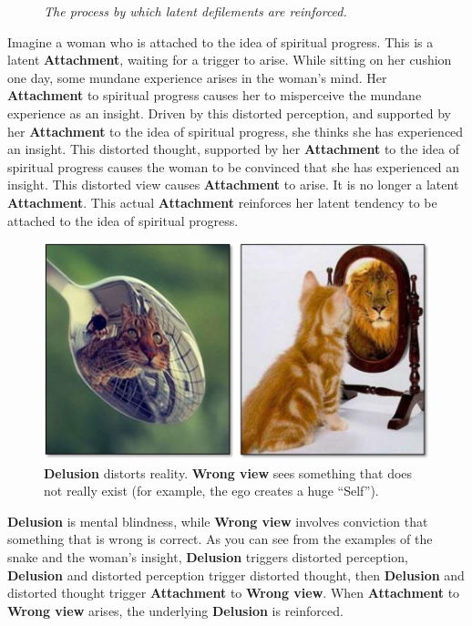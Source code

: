 \begin{figure}[H]
\centering

\caption{\textit{\small The process by which latent defilements are reinforced.}}
\label{fig:Latent}
\end{figure}

Imagine a woman who is attached to the idea of spiritual progress. This is a latent \textbf{Attachment}, waiting for a trigger to arise. While sitting on her cushion one day, some mundane experience arises in the woman’s mind. Her \textbf{Attachment} to spiritual progress causes her to misperceive the mundane experience as an insight. Driven by this distorted perception, and supported by her \textbf{Attachment} to the idea of spiritual progress, she thinks she has experienced an insight. This distorted thought, supported by her \textbf{Attachment} to the idea of spiritual progress causes the woman to be convinced that she has experienced an insight. This distorted view causes \textbf{Attachment} to arise. It is no longer a latent \textbf{Attachment}. This actual \textbf{Attachment} reinforces her latent tendency to be attached to the idea of spiritual progress.

\begin{figure}[H]

\centering
\includegraphics[width=0.7\linewidth]{./Diagrams/Cats}
\caption{\textbf{Delusion} distorts reality. \textbf{Wrong view} sees something that does not really exist (for example, the ego creates a huge “Self”).}
\label{fig:Cats}
\end{figure}

\textbf{Delusion} is mental blindness, while \textbf{Wrong view} involves conviction that something that is wrong is correct. As you can see from the examples of the snake and the woman's insight, \textbf{Delusion} triggers distorted perception, \textbf{Delusion} and distorted perception trigger distorted thought, then \textbf{Delusion} and distorted thought trigger \textbf{Attachment} to \textbf{Wrong view}. When \textbf{Attachment} to \textbf{Wrong view} arises, the underlying \textbf{Delusion} is reinforced.


